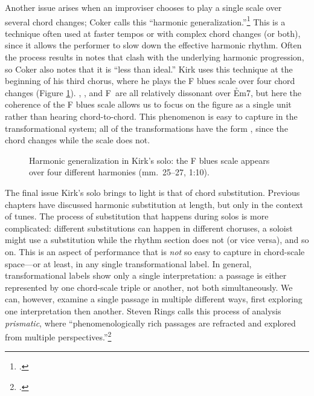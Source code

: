 Another issue arises when an improviser chooses to play a single scale over
several chord changes; Coker calls this ``harmonic
generalization.''\footcite[45--49]{coker:elements} This is a technique often
used at faster tempos or with complex chord changes (or both), since it allows
the performer to slow down the effective harmonic rhythm. Often the process
results in notes that clash with the underlying harmonic progression, so Coker
also notes that it is ``less than ideal.'' Kirk uses this technique
at the beginning of his third chorus, where he plays the F blues scale over
four chord changes (Figure \ref{csa:harmonic-generalization}).
\Bflat, \Aflat, and F\nat\ are all relatively dissonant over \h{Em7}, but here
the coherence of the F blues scale allows us to focus on the figure as a
single unit rather than hearing chord-to-chord. This phenomenon is easy to
capture in the transformational system; all of the transformations have the
form , since the chord changes while the scale does not.

\begin{figure}[tbp]
  \caption[Harmonic generalization in Kirk's solo.]{Harmonic generalization in
    Kirk's solo: the F blues scale appears over four different harmonies
    (mm.~25--27, 1:10).}
  \label{csa:harmonic-generalization}
\end{figure}

The final issue Kirk's solo brings to light is that of chord substitution.
Previous chapters have discussed harmonic substitution at length, but only in
the context of tunes. The process of substitution that happens during solos is
more complicated: different substitutions can happen in different choruses, a
soloist might use a substitution while the rhythm section does not (or vice
versa), and so on. This is an aspect of performance that is \emph{not} so easy
to capture in chord-scale space---or at least, in any single transformational
label. In general, transformational labels show only a single
interpretation: a passage is either represented by one chord-scale triple or
another, not both simultaneously. We can, however, examine a single passage in
multiple different ways, first exploring one interpretation then another.
Steven Rings calls this process of analysis \emph{prismatic}, where
``phenomenologically rich passages are refracted and explored from multiple
perspectives.''\footcite[38]{rings:2011}

